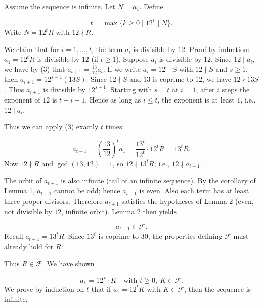 Assume the sequence is infinite. Let \(N=a_1\). Define\par
\[
t=\max\{k\ge0\mid 12^k\mid N\}.
\]
Write \(N=12^tR\) with \(12\nmid R\).\par
We claim that for \(i=1,\dots,t\), the term \(a_i\) is divisible by \(12\). Proof by induction: \(a_1=12^tR\) is divisible by \(12\) (if \(t\ge1\)). Suppose \(a_i\) is divisible by \(12\). Since \(12\mid a_i\), we have by (3) that \(a_{i+1}=\frac{13}{12}a_i\). If we write \(a_i=12^s\cdot S\) with \(12\nmid S\) and \(s\ge1\), then \(a_{i+1}=12^{s-1}(13S)\). Since \(12\nmid S\) and \(13\) is coprime to \(12\), we have \(12\nmid13S\). Thus \(a_{i+1}\) is divisible by \(12^{s-1}\). Starting with \(s=t\) at \(i=1\), after \(i\) steps the exponent of \(12\) is \(t-i+1\). Hence as long as \(i\le t\), the exponent is at least \(1\), i.e., \(12\mid a_i\).\par
Thus we can apply (3) exactly \(t\) times:\par
\[
a_{t+1}=\left(\frac{13}{12}\right)^t a_1 = \frac{13^t}{12^t}\cdot 12^tR = 13^tR.
\]
Now \(12\nmid R\) and \(\gcd(13,12)=1\), so \(12\nmid 13^tR\); i.e., \(12\nmid a_{t+1}\).\par
The orbit of \(a_{t+1}\) is also infinite (tail of an infinite sequence). By the corollary of Lemma 1, \(a_{t+1}\) cannot be odd; hence \(a_{t+1}\) is even. Also each term has at least three proper divisors. Therefore \(a_{t+1}\) satisfies the hypotheses of Lemma 2 (even, not divisible by \(12\), infinite orbit). Lemma 2 then yields\par
\[
a_{t+1}\in\mathcal{F}.
\]
Recall \(a_{t+1}=13^tR\). Since \(13^t\) is coprime to \(30\), the properties defining \(\mathcal{F}\) must already hold for \(R\):\par
{}
Thus \(R\in\mathcal{F}\). We have shown\par
\[
\boxed{a_1=12^{\,t}\cdot K\quad\text{with }t\ge0,\ K\in\mathcal{F}}.
\]
\smallskip
{}
We prove by induction on \(t\) that if \(a_1=12^tK\) with \(K\in\mathcal{F}\), then the sequence is infinite.\par
{}
